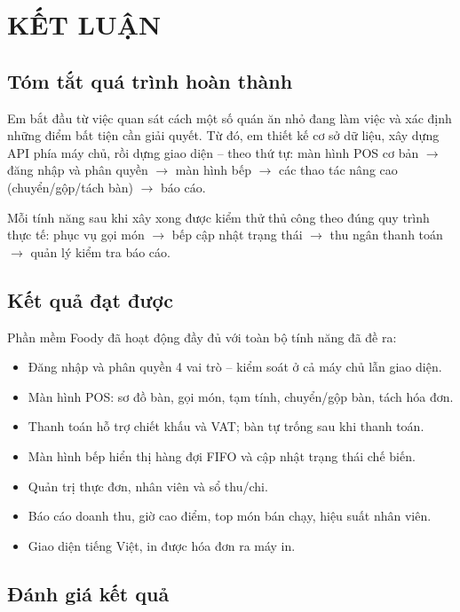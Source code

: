 \documentclass[12pt,a4paper]{report}
\begin{document}
\chapter{KẾT LUẬN}

\section{Tóm tắt quá trình hoàn thành}

Em bắt đầu từ việc quan sát cách một số quán ăn nhỏ đang làm việc và xác định những điểm bất tiện cần giải quyết. Từ đó, em thiết kế cơ sở dữ liệu, xây dựng API phía máy chủ, rồi dựng giao diện -- theo thứ tự: màn hình POS cơ bản $\rightarrow$ đăng nhập và phân quyền $\rightarrow$ màn hình bếp $\rightarrow$ các thao tác nâng cao (chuyển/gộp/tách bàn) $\rightarrow$ báo cáo.

Mỗi tính năng sau khi xây xong được kiểm thử thủ công theo đúng quy trình thực tế: phục vụ gọi món $\rightarrow$ bếp cập nhật trạng thái $\rightarrow$ thu ngân thanh toán $\rightarrow$ quản lý kiểm tra báo cáo.

\section{Kết quả đạt được}

Phần mềm Foody đã hoạt động đầy đủ với toàn bộ tính năng đã đề ra:

\begin{itemize}
  \item Đăng nhập và phân quyền 4 vai trò -- kiểm soát ở cả máy chủ lẫn giao diện.
  \item Màn hình POS: sơ đồ bàn, gọi món, tạm tính, chuyển/gộp bàn, tách hóa đơn.
  \item Thanh toán hỗ trợ chiết khấu và VAT; bàn tự trống sau khi thanh toán.
  \item Màn hình bếp hiển thị hàng đợi FIFO và cập nhật trạng thái chế biến.
  \item Quản trị thực đơn, nhân viên và sổ thu/chi.
  \item Báo cáo doanh thu, giờ cao điểm, top món bán chạy, hiệu suất nhân viên.
  \item Giao diện tiếng Việt, in được hóa đơn ra máy in.
\end{itemize}

\section{Đánh giá kết quả}
\end{document}

